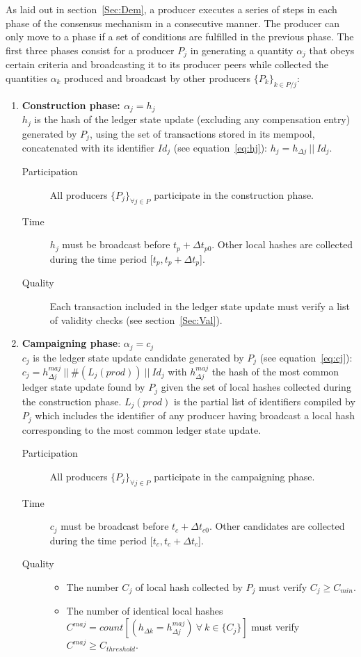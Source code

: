 As laid out in section~\ref{Sec:Dem}, a producer executes a series of steps in each phase of the consensus mechanism in a consecutive manner. The producer can only move to a phase if a set of conditions are fulfilled in the previous phase. The first three phases consist for a producer $P_j$ in generating a quantity $\alpha_j$ that obeys certain criteria and broadcasting it to its producer peers while collected the quantities $\alpha_k$ produced and broadcast by other producers $\{P_k\}_{k\in P/j}$:
\begin{enumerate}
\item \textbf{Construction phase: $\alpha_j = h_j$} \\
 $h_j$ is the hash of the ledger state update (excluding any compensation entry) generated by $P_j$, using the set of transactions stored in its mempool, concatenated with its identifier $Id_j$ (see equation~\ref{eq:hj}): $h_j = h_{\Delta j}~||~Id_j$. 
\begin{description}
\item[Participation] All producers $\{P_j\}_{\forall j \in P}$ participate in the construction phase. 
\item[Time] $h_j$ must be broadcast before $t_p + \Delta t_{p0}$. Other local hashes are collected during the time period [$t_p, t_p + \Delta t_{p}$].
\item[Quality] Each transaction included in the ledger state update must verify a list of validity checks (see section~\ref{Sec:Val}). 
\end{description}

\item \textbf{Campaigning phase}: $\alpha_j = c_j$\\
$c_j$ is the ledger state update candidate generated by $P_j$ (see equation~\ref{eq:cj}):\\
$c_j = h^{maj}_{\Delta j}~||~\#(L_j(prod))~||~Id_j$ with $h^{maj}_{\Delta j}$ the hash of the most common ledger state update found by $P_j$ given the set of local hashes collected during the construction phase. $L_j(prod)$ is the partial list of identifiers compiled by $P_j$ which includes the identifier of any producer having broadcast a local hash corresponding to the most common ledger state update.
\begin{description}
\item[Participation] All producers $\{P_j\}_{\forall j\in P}$ participate in the campaigning phase. 
\item[Time] $c_j$ must be broadcast before $t_c + \Delta t_{c0}$. Other candidates are collected during the time period [$t_c, t_c + \Delta t_{c}$].
\item[Quality] 
\begin{itemize}
\item The number $C_j$ of local hash collected by $P_j$ must verify $C_j \geq C_{min}$.
\item The number of identical local hashes $C^{maj} = count[(h_{\Delta k} = h^{maj}_{\Delta j})~\forall~k\in\{C_j\}]$ must verify $C^{maj} \geq C_{threshold}$.
\end{itemize}
\end{description}


\end{enumerate}
